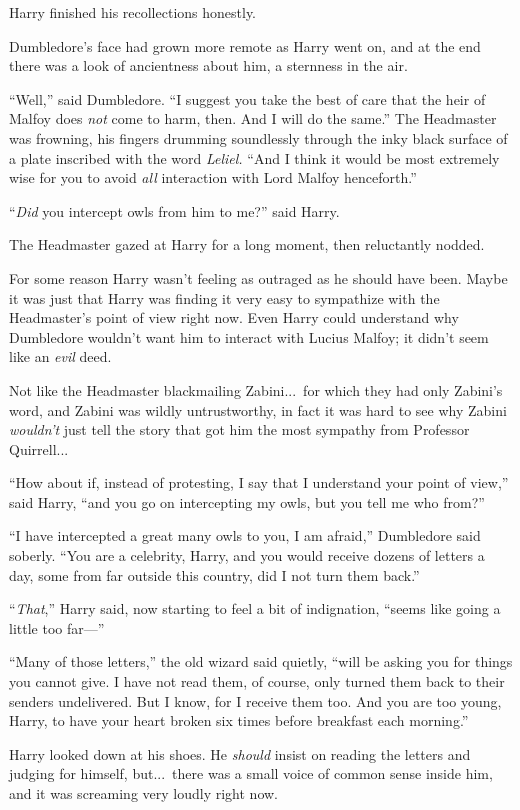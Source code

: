 Harry finished his recollections honestly.

Dumbledore’s face had grown more remote as Harry went on, and at the end there was a look of ancientness about him, a sternness in the air.

“Well,” said Dumbledore. “I suggest you take the best of care that the heir of Malfoy does \emph{not} come to harm, then. And I will do the same.” The Headmaster was frowning, his fingers drumming soundlessly through the inky black surface of a plate inscribed with the word \emph{Leliel.} “And I think it would be most extremely wise for you to avoid \emph{all} interaction with Lord Malfoy henceforth.”

“\emph{Did} you intercept owls from him to me?” said Harry.

The Headmaster gazed at Harry for a long moment, then reluctantly nodded.

For some reason Harry wasn’t feeling as outraged as he should have been. Maybe it was just that Harry was finding it very easy to sympathize with the Headmaster’s point of view right now. Even Harry could understand why Dumbledore wouldn’t want him to interact with Lucius Malfoy; it didn’t seem like an \emph{evil} deed.

Not like the Headmaster blackmailing Zabini...\ for which they had only Zabini’s word, and Zabini was wildly untrustworthy, in fact it was hard to see why Zabini \emph{wouldn’t} just tell the story that got him the most sympathy from Professor Quirrell...

“How about if, instead of protesting, I say that I understand your point of view,” said Harry, “and you go on intercepting my owls, but you tell me who from?”

“I have intercepted a great many owls to you, I am afraid,” Dumbledore said soberly. “You are a celebrity, Harry, and you would receive dozens of letters a day, some from far outside this country, did I not turn them back.”

“\emph{That},” Harry said, now starting to feel a bit of indignation, “seems like going a little too far—”

“Many of those letters,” the old wizard said quietly, “will be asking you for things you cannot give. I have not read them, of course, only turned them back to their senders undelivered. But I know, for I receive them too. And you are too young, Harry, to have your heart broken six times before breakfast each morning.”

Harry looked down at his shoes. He \emph{should} insist on reading the letters and judging for himself, but...\ there was a small voice of common sense inside him, and it was screaming very loudly right now.

